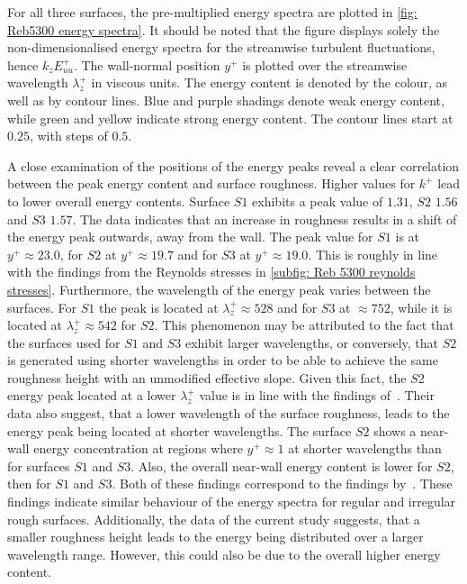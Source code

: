 For all three surfaces, the pre-multiplied energy spectra are plotted in \autoref{fig: Reb5300 energy spectra}.
It should be noted that the figure displays solely the non-dimensionalised energy spectra for the streamwise turbulent fluctuations, hence $k_zE_{uu}^+$.
The wall-normal position $y^+$ is plotted over the streamwise wavelength $\lambda_z^+$ in viscous units.
The energy content is denoted by the colour, as well as by contour lines.
Blue and purple shadings denote weak energy content, while green and yellow indicate
 strong energy content.
The contour lines start at $0.25$, with steps of $0.5$.

A close examination of the positions of the energy peaks reveal a clear correlation between the peak energy content and surface roughness. 
Higher values for $k^+$ lead to lower overall energy contents.
Surface $S1$ exhibits a peak value of $1.31$, $S2$ $1.56$ and $S3$ $1.57$.
The data indicates that an increase in roughness results in a shift of the energy peak outwards, away from the wall.
The peak value for $S1$ is at $y^+ \approx 23.0$, for $S2$ at $y^+ \approx 19.7$ and for $S3$ at $y^+ \approx 19.0$.
This is roughly in line with the findings from the Reynolds stresses in \autoref{subfig: Reb 5300 reynolds stresses}.
Furthermore, the wavelength of the energy peak varies between the surfaces. 
For $S1$ the peak is located at $\lambda_z^+ \approx 528$ and for $S3$ at $\approx 752$, while it is located at $\lambda_z^+ \approx 542$ for $S2$.
This phenomenon may be attributed to the fact that the surfaces used for $S1$ and $S3$ exhibit larger wavelengths, or conversely, that $S2$ is generated using shorter wavelengths in order to be able to achieve the same roughness height with an unmodified effective slope.
Given this fact, the $S2$ energy peak located at a lower $\lambda_z^+$ value is in line with the findings of~\cite{chanSecondaryMotionTurbulent2018}.
Their data also suggest, that a lower wavelength of the surface roughness, leads to the energy peak being located at shorter wavelengths.
The surface $S2$ shows a near-wall energy concentration at regions where $y^+ \approx 1$ at shorter wavelengths than for surfaces $S1$ and $S3$.
Also, the overall near-wall energy content is lower for $S2$, then for $S1$ and $S3$.
Both of these findings correspond to the findings by~\cite{chanSecondaryMotionTurbulent2018}. 
These findings indicate similar behaviour of the energy spectra for regular and irregular rough surfaces.
Additionally, the data of the current study suggests, that a smaller roughness height leads to the energy being distributed over a larger wavelength range.
However, this could also be due to the overall higher energy content.

